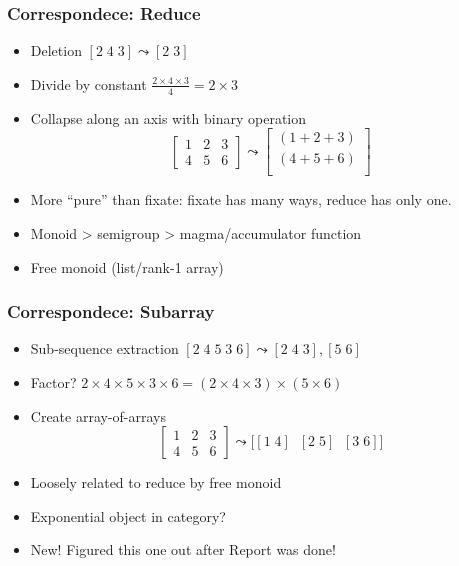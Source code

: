 \documentclass[xetex,mathserif,serif]{beamer}
\begin{document}
\begin{frame}
  \frametitle{Correspondece: Reduce}
  \begin{itemize}%
    \item Deletion \([2\;4\;3] \leadsto [2\;3]\)
    \item Divide by constant \(\frac{2\times4\times3}4 = 2\times3\)
    \item Collapse along an axis with binary operation
      \[
        \begin{bmatrix}
          1 & 2 & 3 \\
          4 & 5 & 6
        \end{bmatrix} \leadsto
        \begin{bmatrix}
          (1 + 2 + 3) \\
          (4 + 5 + 6) \\
        \end{bmatrix}
      \]
    \item More ``pure'' than fixate: fixate has many ways,
      reduce has only one.
    \item Monoid > semigroup > magma/accumulator function
    \item Free monoid (list/rank-1 array)
  \end{itemize}
\end{frame}

\begin{frame}
  \frametitle{Correspondece: Subarray}
  \begin{itemize}%
    \item Sub-sequence extraction \([2\;4\;5\;3\;6] \leadsto [2\;4\;3], [5\;6]\)
    \item Factor? \(2\times4\times5\times3\times6 = (2\times4\times3)\times(5\times6)\)
    \item Create array-of-arrays
      \[
        \begin{bmatrix}
          1 & 2 & 3 \\
          4 & 5 & 6
        \end{bmatrix} \leadsto \big[[1\;4]\;\;[2\;5]\;\;[3\;6]\big]
      \]
    \item Loosely related to reduce by free monoid
    \item Exponential object in category?
    \item New! Figured this one out after Report was done!
  \end{itemize}
\end{frame}
\end{document}
